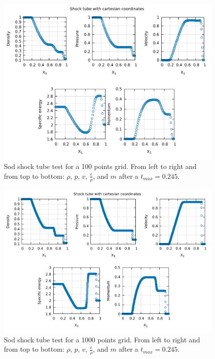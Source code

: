 \documentclass{article}
\begin{document}
\begin{figure}[H]
	\centering
	\includegraphics[width=0.9 \linewidth]{cartshock100.pdf}
	\caption{Sod shock tube test for a 100 points grid. From left to right and from top to bottom: $\rho$, $p$, $v$, $\frac{\epsilon}{\rho}$, and $m$ after a $t_{max}=0.245$.}
	\label{fig:cartshock100}
\end{figure}
\begin{figure}[H]
	\centering
	\includegraphics[width=0.9 \linewidth]{cartshock.pdf}
	\caption{Sod shock tube test for a 1000 points grid. From left to right and from top to bottom: $\rho$, $p$, $v$, $\frac{\epsilon}{\rho}$, and $m$ after a $t_{max}=0.245$.}
	\label{fig:cartshock1000}
\end{figure}
\end{document}
